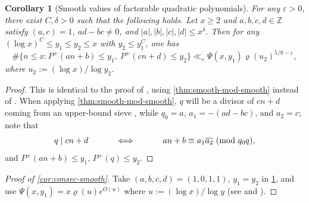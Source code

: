 \documentclass[reqno,11pt]{amsart}
\newtheorem{corollary}[theorem]{Corollary}
\theoremstyle{remark}
\numberwithin{equation}{section}
\newcommand{\Z}{\mathbb{Z}}
\newcommand{\eps}{\varepsilon}
\renewcommand{\bar}{\overline}
\renewcommand{\pmod}[1]{\ (\textnormal{mod } #1)}
\begin{document}

\begin{corollary}[Smooth values of factorable quadratic polynomials] \label{cor:factorable-quadratic}
For any $\eps > 0$, there exist $C, \delta > 0$ such that the following holds. Let $x \ge 2$ and $a, b, c, d \in \Z$ satisfy $(a, c) = 1$, $ad - bc \neq 0$, and $|a|, |b|, |c|, |d| \le x^\delta$. Then for any $(\log x)^C \le y_1 \le y_2 \le x$ with $y_2 \le y_1^C$, one has
\[
    \#\{n \le x : P^+(an+b) \le y_1,\ P^+(cn+d) \le y_2\} \ll_\eps \Psi(x, y_1) \varrho(u_2)^{5/8-\eps},
\]
where $u_2 := (\log x)/\log y_2$.
\end{corollary}

\begin{proof}
This is identical to the proof of \cite[Th\'eor\`eme 4.1]{de2020niveau}, using  \cref{thm:smooth-mod-smooth} instead of \cite[Th\'eor\`eme 2.1]{de2020niveau}. When applying \cref{thm:smooth-mod-smooth}, $q$ will be a divisor of $cn+d$ coming from an upper-bound sieve \cite[Proposition 3.1]{de2020niveau}, while $q_0 = a$, $a_1 = -(ad-bc)$, and $a_2 = c$; note that 
\[
    q \mid cn+d \qquad\quad \iff \qquad\quad an+b \equiv a_1\bar{a_2} \pmod{q_0q},
\]
and $P^+(an+b) \le y_1$, $P^+(q) \le y_2$.
\end{proof}

\begin{proof}[Proof of \cref{cor:consec-smooth}]
Take $(a, b, c, d) = (1, 0, 1, 1)$, $y_1 = y_2$ in \cref{cor:factorable-quadratic}, and use $\Psi(x, y_1) = x \varrho(u) e^{O(u)}$ where $u := (\log x)/\log y$  (see \cite[(1.7)]{de2020niveau} and \cite[(2.6) and (2.7)]{hildebrand1986number}).
\end{proof}


\let\oldaddcontentsline\addcontentsline
\renewcommand{\addcontentsline}[3]{}


\let\addcontentsline\oldaddcontentsline
\end{document}
